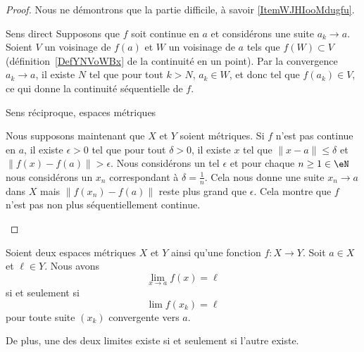 \begin{proof}
    Nous ne démontrons que la partie difficile, à savoir \ref{ItemWJHIooMdugfu}.
    \begin{subproof}
    \item[Sens direct]
        Supposons que \( f\) soit continue en \( a\) et considérons une suite \( a_k\to a\). Soient \( V\) un voisinage de \( f(a)\) et \( W\) un voisinage de \( a\) tels que \( f(W)\subset V\) (définition~\ref{DefYNVoWBx} de la continuité en un point). Par la convergence \( a_k\to a\),  il existe \( N\) tel que pour tout \( k>N\), \( a_k\in W\), et donc tel que \( f(a_k)\in V\), ce qui donne la continuité séquentielle de \( f\).
    \item[Sens réciproque, espaces métriques]

        Nous supposons maintenant que \( X\) et \( Y\) soient métriques. Si \( f\) n'est pas continue en \( a\), il existe \( \epsilon>0\) tel que pour tout \( \delta>0\), il existe \( x\) tel que \( \| x-a \|\leq\delta\) et \( \| f(x)-f(a) \|>\epsilon\). Nous considérons un tel \( \epsilon\) et pour chaque \( n\geq1\in \eN\) nous considérons un \( x_n\) correspondant à \( \delta=\frac{1}{ n }\). Cela nous donne une suite \( x_n\to a\) dans \( X\) mais \( \| f(x_n) -f(a)\|\) reste plus grand que \( \epsilon\). Cela montre que \( f\) n'est pas non plus séquentiellement continue.
    \end{subproof}
\end{proof}

\begin{proposition}     \label{PROPooJYOOooZWocoq}
    Soient deux espaces métriques \( X\) et \( Y\) ainsi qu'une fonction \( f\colon X\to Y\). Soit \( a\in X\) et \( \ell\in Y\). Nous avons
    \begin{equation}
        \lim_{x\to a} f(x)=\ell
    \end{equation}
    si et seulement si
    \begin{equation}
        \lim f(x_k)=\ell
    \end{equation}
    pour toute suite \( (x_k)\) convergente vers \( a\).

    De plus, une des deux limites existe si et seulement si l'autre existe.
\end{proposition}

